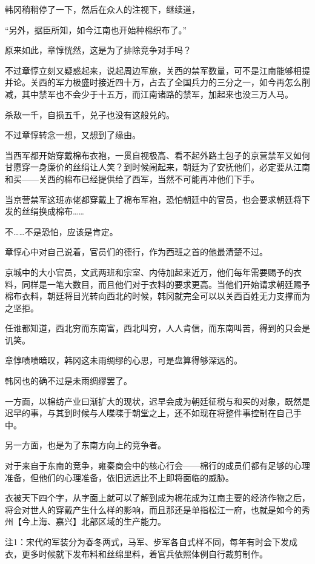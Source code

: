 韩冈稍稍停了一下，然后在众人的注视下，继续道，

“另外，据臣所知，如今江南也开始种棉织布了。”

原来如此，章惇恍然，这是为了排除竞争对手吗？

不过章惇立刻又疑惑起来，说起周边军旅，关西的禁军数量，可不是江南能够相提并论。关西的军力极盛时接近四十万，占去了全国兵力的三分之一，如今再怎么削减，其中禁军也不会少于十五万，而江南诸路的禁军，加起来也没三万人马。

杀敌一千，自损五千，兑子也没有这般兑的。

不过章惇转念一想，又想到了缘由。

当西军都开始穿戴棉布衣袍，一贯自视极高、看不起外路土包子的京营禁军又如何甘愿穿一身廉价的丝绢让人笑？到时候闹起来，朝廷为了安抚他们，必定要从江南和买——关西的棉布已经提供给了西军，当然不可能再冲他们下手。

当京营禁军这班赤佬都穿戴上了棉布军袍，恐怕朝廷中的官员，也会要求朝廷将下发的丝绢换成棉布……

不……不是恐怕，应该是肯定。

章惇心中对自己说着，官员们的德行，作为西班之首的他最清楚不过。

京城中的大小官员，文武两班和宗室、内侍加起来近万，他们每年需要赐予的衣料，同样是一笔大数目，而且他们对于衣料的要求更高。当他们开始请求朝廷赐予棉布衣料，朝廷将目光转向西北的时候，韩冈就完全可以以关西百姓无力支撑而为之坚拒。

任谁都知道，西北穷而东南富，西北叫穷，人人肯信，而东南叫苦，得到的只会是讥笑。

章惇啧啧暗叹，韩冈这未雨绸缪的心思，可是盘算得够深远的。

韩冈也的确不过是未雨绸缪罢了。

一方面，以棉纺产业曰渐扩大的现状，迟早会成为朝廷征税与和买的对象，既然是迟早的事，与其到时候与人喋喋于朝堂之上，还不如现在将整件事控制在自己手中。

另一方面，也是为了东南方向上的竞争者。

对于来自于东南的竞争，雍秦商会中的核心行会——棉行的成员们都有足够的心理准备，但他们的心理准备，依旧远远比不上即将面临的威胁。

衣被天下四个字，从字面上就可以了解到成为棉花成为江南主要的经济作物之后，将会对世人的穿戴产生什么样的影响，而且那还是单指松江一府，也就是如今的秀州【今上海、嘉兴】北部区域的生产能力。

注1：宋代的军装分为春冬两式，马军、步军各自式样不同，每年有时会下发成衣，更多时候就下发布料和丝绵里料，着官兵依照体例自行裁剪制作。

